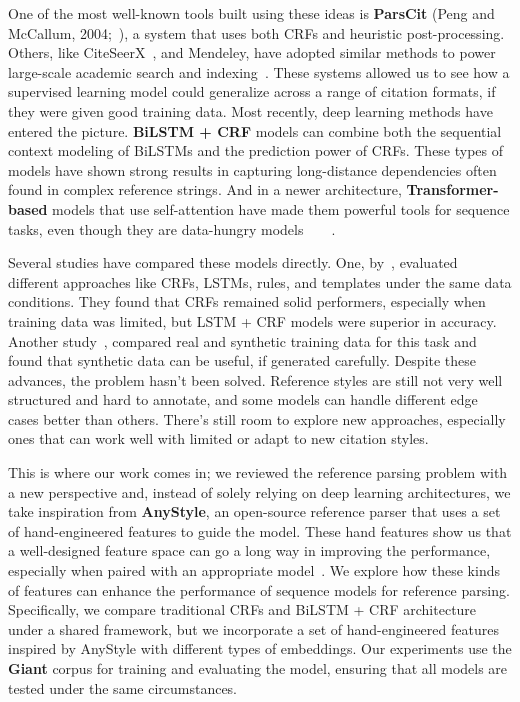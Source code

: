 One of the most well-known tools built using these ideas is \textbf{ParsCit} (Peng and McCallum, 2004;~\cite{councill-etal-2008-parscit}), a system that uses both CRFs and heuristic post-processing. Others, like CiteSeerX~\cite{citeseerx}, and Mendeley, have adopted similar methods to power large-scale academic search and indexing~\cite{prasad2018neuralparscit}. These systems allowed us to see how a supervised learning model could generalize across a range of citation formats, if they were given good training data.
Most recently, deep learning methods have entered the picture. \textbf{BiLSTM + CRF} models can combine both the sequential context modeling of BiLSTMs and the prediction power of CRFs. These types of models have shown strong results in capturing long-distance dependencies often found in complex reference strings. And in a newer architecture, \textbf{Transformer-based} models that use self-attention have made them powerful tools for sequence tasks, even though they are data-hungry models~\cite{opensourcebib}~\cite{Syntheticvreal}~\cite{jain2023entityextraction}~\cite{annotatedcorpus}.

Several studies have compared these models directly. One, by~\cite{opensourcebib}, evaluated different approaches like CRFs, LSTMs, rules, and templates under the same data conditions. They found that CRFs remained solid performers, especially when training data was limited, but LSTM + CRF models were superior in accuracy. Another study~\cite{Syntheticvreal}, compared real and synthetic training data for this task and found that synthetic data can be useful, if generated carefully.
Despite these advances, the problem hasn’t been solved. Reference styles are still not very well structured and hard to annotate, and some models can handle different edge cases better than others. There’s still room to explore new approaches, especially ones that can work well with limited or adapt to new citation styles.

This is where our work comes in; we reviewed the reference parsing problem with a new perspective and, instead of solely relying on deep learning architectures, we take inspiration from \textbf{AnyStyle}, an open-source reference parser that uses a set of hand-engineered features to guide the model. These hand features show us that a well-designed feature space can go a long way in improving the performance, especially when paired with an appropriate model~\cite{anystyle}.
We explore how these kinds of features can enhance the performance of sequence models for reference parsing. Specifically, we compare traditional CRFs and BiLSTM + CRF architecture under a shared framework, but we incorporate a set of hand-engineered features inspired by AnyStyle with different types of embeddings. Our experiments use the \textbf{Giant} corpus for training and evaluating the model, ensuring that all models are tested under the same circumstances.

